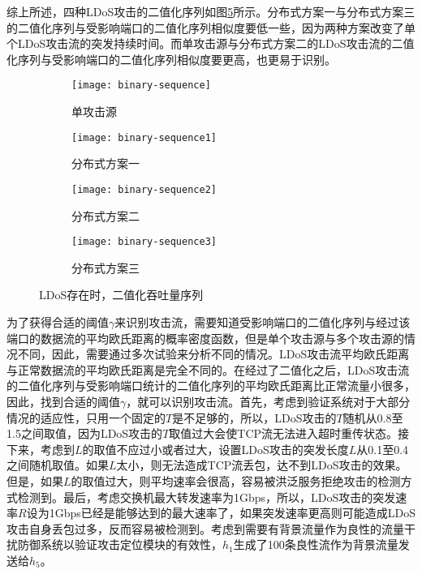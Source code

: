 综上所述，四种LDoS攻击的二值化序列如图\ref{fig:binary-sequence-all}所示。分布式方案一与分布式方案三的二值化序列与受影响端口的二值化序列相似度要低一些，因为两种方案改变了单个LDoS攻击流的突发持续时间。而单攻击源与分布式方案二的LDoS攻击流的二值化序列与受影响端口的二值化序列相似度要更高，也更易于识别。


\begin{figure}
    \begin{subfigure}{.49\textwidth}
        \centering
        \texttt{[image: binary-sequence]}
        \caption{单攻击源}
        \label{fig:binary-sequence-single}
    \end{subfigure}
    \begin{subfigure}{.49\textwidth}
        \centering
        \texttt{[image: binary-sequence1]}
        \caption{分布式方案一}
        \label{fig:binary-sequence-2h-mod1}
    \end{subfigure}

    \begin{subfigure}{.49\textwidth}
        \centering
        \texttt{[image: binary-sequence2]}
        \caption{分布式方案二}
        \label{fig:binary-sequence-2h-mod2}
    \end{subfigure}
    \begin{subfigure}{.49\textwidth}
        \centering
        \texttt{[image: binary-sequence3]}
        \caption{分布式方案三}
        \label{fig:binary-sequence-2h-mod3}
    \end{subfigure}


    \caption{LDoS存在时，二值化吞吐量序列}
    \label{fig:binary-sequence-all}
\end{figure}




为了获得合适的阈值$\gamma$来识别攻击流，需要知道受影响端口的二值化序列与经过该端口的数据流的平均欧氏距离的概率密度函数，但是单个攻击源与多个攻击源的情况不同，因此，需要通过多次试验来分析不同的情况。LDoS攻击流平均欧氏距离与正常数据流的平均欧氏距离是完全不同的。在经过了二值化之后，LDoS攻击流的二值化序列与受影响端口统计的二值化序列的平均欧氏距离比正常流量小很多，因此，找到合适的阈值$\gamma$，就可以识别攻击流。首先，考虑到验证系统对于大部分情况的适应性，只用一个固定的$T$是不足够的，所以，LDoS攻击的$T$随机从0.8至1.5之间取值，因为LDoS攻击的$T$取值过大会使TCP流无法进入超时重传状态。接下来，考虑到$L$的取值不应过小或者过大，设置LDoS攻击的突发长度$L$从0.1至0.4之间随机取值。如果$L$太小，则无法造成TCP流丢包，达不到LDoS攻击的效果。但是，如果$L$的取值过大，则平均速率会很高，容易被洪泛服务拒绝攻击的检测方式检测到。最后，考虑交换机最大转发速率为1Gbps，所以，LDoS攻击的突发速率$R$设为1Gbps已经是能够达到的最大速率了，如果突发速率更高则可能造成LDoS攻击自身丢包过多，反而容易被检测到。考虑到需要有背景流量作为良性的流量干扰防御系统以验证攻击定位模块的有效性，$h_1$生成了100条良性流作为背景流量发送给$h_5$。

